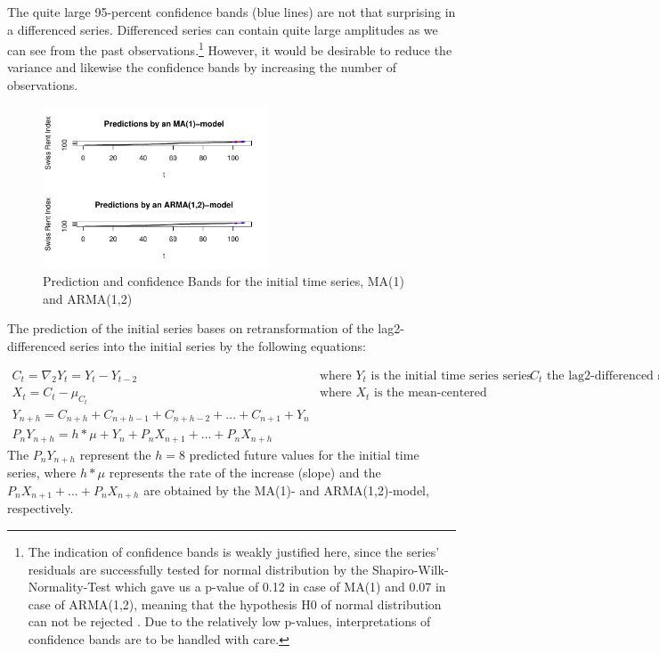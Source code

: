 \documentclass[11pt,a4paper]{article}
\begin{document}
The quite large 95-percent confidence bands (blue lines) are not that surprising in a differenced series. Differenced series can contain quite large amplitudes as we can see from the past observations.\footnote{
    The indication of confidence bands is weakly justified here, since the series’ residuals are successfully tested for normal distribution by the Shapiro-Wilk-Normality-Test which gave us a p-value of 0.12 in case of MA(1) and 0.07 in case of ARMA(1,2), meaning that the hypothesis H0 of normal distribution can not be rejected \citep{shapiro}. Due to the relatively low p-values, interpretations of confidence bands are to be handled with care.
}
However, it would be desirable to reduce the variance and likewise the confidence bands by increasing the number of observations. 
\begin{figure} [ht]
    \centering
    \includegraphics[width=0.6\textwidth]{pred_initial_series}
    \caption{Prediction and confidence Bands for the initial time series, MA(1) and ARMA(1,2)}
    \label{fig:pred_initial_series}
\end{figure}

The prediction of the initial series bases on retransformation of the lag2-differenced series into the initial series by the following equations: 

\begin{align*}
C_t = \nabla_2 Y_t = Y_t - Y_{t-2}  & \text{where $Y_t$ is the initial time series series and $C_t$ the lag2-differenced series} \\
X_t = C_t - \mu_{C_t} & \text{where $X_t$ is the mean-centered differenced series}\\
Y_{n+h} = C_{n+h} + C_{n+h-1} + C_{n+h-2} + ... + C_{n+1} + Y_n  \\
P_n Y_{n+h} = h*\mu + Y_n+ P_n X_{n+1} + ... + P_n X_{n+h}  
\end{align*}
The $P_n Y_{n+h}$ represent the $h=8$ predicted future values for the initial time series, where $h*\mu$ represents the rate of the increase (slope) and the $P_n X_{n+1} + ... + P_n X_{n+h} $ are obtained by the MA(1)- and ARMA(1,2)-model, respectively.
\end{document}
